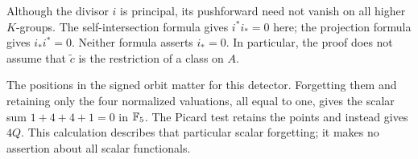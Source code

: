 \begin{remark}
Although the divisor $i$ is principal, its pushforward need not vanish on
all higher $K$-groups. The self-intersection formula gives $i^*i_*=0$ here;
the projection formula gives $i_*i^*=0$. Neither formula asserts $i_*=0$.
In particular, the proof does not assume that $\widetilde c$ is the
restriction of a class on $A$.
\end{remark}


The positions in the signed orbit matter for this detector. Forgetting
them and retaining only the four normalized valuations, all equal to one,
gives the scalar sum $1+4+4+1=0$ in $\mathbb F_5$. The Picard test retains the
points and instead gives $4Q$. This calculation describes that particular
scalar forgetting; it makes no assertion about all scalar functionals.

